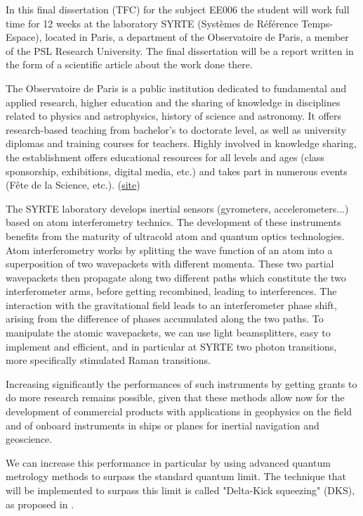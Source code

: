 \documentclass[english, a4paper, 11pt]{article}
\begin{document}
In this final dissertation (TFC) for the subject EE006 the student will work  full time for 12 weeks at the laboratory SYRTE (Systèmes de Référence Temps-Espace), located in Paris, a department of the Observatoire de Paris, a member of the PSL Research University. The final dissertation will be a report written in the form of a scientific article about the work done there. 

The Observatoire de Paris is a public institution dedicated to fundamental and applied research, higher education and the sharing of knowledge in disciplines related to physics and astrophysics, history of science and astronomy. It offers research-based teaching from bachelor's to doctorate level, as well as university diplomas and training courses for teachers. Highly involved in knowledge sharing, the establishment offers educational resources for all levels and ages (class sponsorship, exhibitions, digital media, etc.) and takes part in numerous events (Fête de la Science, etc.). (\href{https://www.observatoiredeparis.psl.eu/-observatoire-de-paris-.html?lang=fr}{site})

The SYRTE laboratory develops inertial sensors (gyrometers, accelerometers...) based on atom interferometry technics. The development of these instruments benefits from the maturity of ultracold atom and quantum optics technologies. Atom interferometry works by splitting the wave function of an atom into a superposition of two wavepackets with different momenta. These two partial wavepackets then propagate along two different paths which constitute the two interferometer arms, before getting recombined, leading to interferences. The interaction with the gravitational field leads to an interferometer phase shift, arising from the difference of phases accumulated along the two paths. To manipulate the atomic wavepackets, we can use light beamsplitters, easy to implement and efficient, and in particular at SYRTE two photon transitions, more specifically stimulated Raman transitions. 

Increasing significantly the performances of such instruments by getting grants to do more research remains possible, given that these methods allow now for the development of commercial products with applications in geophysics on the field and of onboard instruments in ships or planes for inertial navigation and geoscience. 

We can increase this performance in particular by using advanced quantum metrology methods to surpass the standard quantum limit.
The technique that will be implemented to surpass this limit is called  "Delta-Kick squeezing" (DKS), as proposed in \cite{Corgier_2021}.
\end{document}
